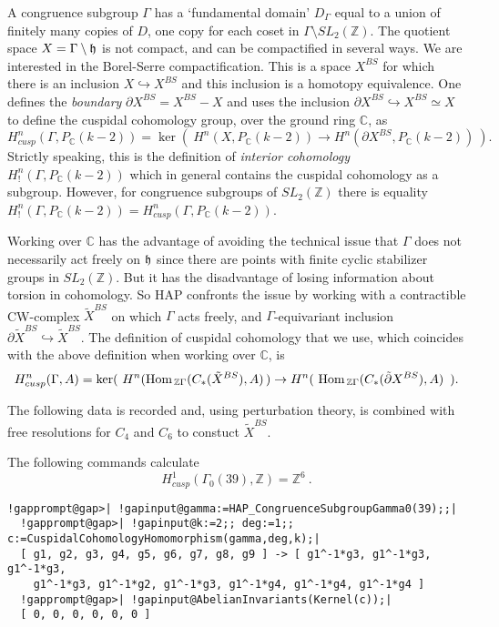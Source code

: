 \documentclass[a4paper,11pt]{report}
\begin{document}
{{ A congruence subgroup $\Gamma$ has a `fundamental domain' $D_\Gamma$ equal to a union of finitely many copies of $D$, one copy for each coset in $\Gamma\setminus SL_2(\mathbb Z)$. The quotient space $X=\Gamma\setminus {\frak h}$ is not compact, and can be compactified in several ways. We are interested in
the Borel-Serre compactification. This is a space $X^{BS}$ for which there is an inclusion $X\hookrightarrow X^{BS}$ and this inclusion is a homotopy equivalence. One defines the \emph{boundary} $\partial X^{BS} = X^{BS} - X$ and uses the inclusion $\partial X^{BS} \hookrightarrow X^{BS} \simeq X$ to define the cuspidal cohomology group, over the ground ring $\mathbb C$, as 
\[ H_{cusp}^n(\Gamma,P_{\mathbb C}(k-2)) = \ker (\ H^n(X,P_{\mathbb C}(k-2))
\rightarrow H^n(\partial X^{BS},P_{\mathbb C}(k-2)) \ ).\]
 Strictly speaking, this is the definition of \emph{interior cohomology} $H_!^n(\Gamma,P_{\mathbb C}(k-2))$ which in general contains the cuspidal cohomology as a subgroup. However, for
congruence subgroups of $SL_2(\mathbb Z)$ there is equality $H_!^n(\Gamma,P_{\mathbb C}(k-2)) = H_{cusp}^n(\Gamma,P_{\mathbb C}(k-2))$. 

 Working over $\mathbb C$ has the advantage of avoiding the technical issue that $\Gamma $ does not necessarily act freely on ${\frak h}$ since there are points with finite cyclic stabilizer groups in $SL_2(\mathbb Z)$. But it has the disadvantage of losing information about torsion in
cohomology. So HAP confronts the issue by working with a contractible
CW-complex $\tilde X^{BS}$ on which $\Gamma$ acts freely, and $\Gamma$-equivariant inclusion $\partial \tilde X^{BS} \hookrightarrow \tilde X^{BS}$. The definition of cuspidal cohomology that we use, which coincides with the
above definition when working over $\mathbb C$, is 
\[ H_{cusp}^n(\Gamma,A) = \ker (\ H^n({\rm Hom}_{\, \mathbb
Z\Gamma}(C_\ast(\tilde X^{BS}), A)\, ) \rightarrow H^n(\ {\rm Hom}_{\, \mathbb
Z\Gamma}(C_\ast(\tilde \partial X^{BS}), A)\, \ ).\]
 

The following data is recorded and, using perturbation theory, is combined
with free resolutions for $C_4$ and $C_6$ to constuct $\tilde X^{BS}$. 

 

 The following commands calculate 
\[H^1_{cusp}(\Gamma_0(39),\mathbb Z) = \mathbb Z^6\ .\]
 
\begin{Verbatim}[commandchars=!@|,fontsize=\small,frame=single,label=Example]
  !gapprompt@gap>| !gapinput@gamma:=HAP_CongruenceSubgroupGamma0(39);;|
  !gapprompt@gap>| !gapinput@k:=2;; deg:=1;; c:=CuspidalCohomologyHomomorphism(gamma,deg,k);|
  [ g1, g2, g3, g4, g5, g6, g7, g8, g9 ] -> [ g1^-1*g3, g1^-1*g3, g1^-1*g3, 
    g1^-1*g3, g1^-1*g2, g1^-1*g3, g1^-1*g4, g1^-1*g4, g1^-1*g4 ]
  !gapprompt@gap>| !gapinput@AbelianInvariants(Kernel(c));|
  [ 0, 0, 0, 0, 0, 0 ]
  

\end{Verbatim}}}
\end{document}
